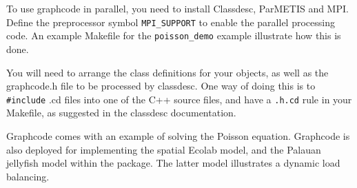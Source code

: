To use graphcode in parallel, you need to install
Classdesc, ParMETIS and
MPI. Define the preprocessor symbol
\verb+MPI_SUPPORT+ to enable the parallel
processing code. An example Makefile for the \verb+poisson_demo+
example illustrate how this is done.

You will need to arrange the class definitions for your objects, as
well as the graphcode.h file to be processed by 
classdesc. One way of doing this is to \verb+#include+ .cd files into one of
the C++ source files, and have a \verb+.h.cd+ rule in your Makefile, as
suggested in the classdesc documentation.



Graphcode comes with an example of solving the Poisson
equation. Graphcode is also deployed for implementing the spatial
Ecolab model, and the Palauan jellyfish model within the \EcoLab{}
package. The latter model illustrates a dynamic load balancing.
